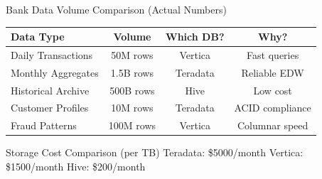 \documentclass{beamer}
\begin{document}
	
	\begin{frame}{Bank Data Volume Comparison (Actual Numbers)}
		\begin{center}
			\begin{tabular}{|l|c|c|c|}
				\hline
				\textbf{Data Type} & \textbf{Volume} & \textbf{Which DB?} & \textbf{Why?} \\
				\hline
				Daily Transactions & 50M rows & Vertica & Fast queries \\
				\hline
				Monthly Aggregates & 1.5B rows & Teradata & Reliable EDW \\
				\hline
				Historical Archive & 500B rows & Hive & Low cost \\
				\hline
				Customer Profiles & 10M rows & Teradata & ACID compliance \\
				\hline
				Fraud Patterns & 100M rows & Vertica & Columnar speed \\
				\hline
			\end{tabular}
		\end{center}
		
		\begin{alertblock}{Storage Cost Comparison (per TB)}
			Teradata: \$5000/month \quad Vertica: \$1500/month \quad Hive: \$200/month
		\end{alertblock}
	\end{frame}
	
\end{document}
